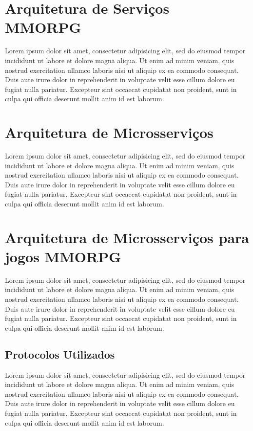\section{Arquitetura de Serviços MMORPG}

Lorem ipsum dolor sit amet, consectetur adipisicing elit, sed do eiusmod tempor incididunt ut labore et dolore magna aliqua. Ut enim ad minim veniam, quis nostrud exercitation ullamco laboris nisi ut aliquip ex ea commodo consequat. Duis aute irure dolor in reprehenderit in voluptate velit esse cillum dolore eu fugiat nulla pariatur. Excepteur sint occaecat cupidatat non proident, sunt in culpa qui officia deserunt mollit anim id est laborum.

\section{Arquitetura de Microsserviços}

Lorem ipsum dolor sit amet, consectetur adipisicing elit, sed do eiusmod tempor incididunt ut labore et dolore magna aliqua. Ut enim ad minim veniam, quis nostrud exercitation ullamco laboris nisi ut aliquip ex ea commodo consequat. Duis aute irure dolor in reprehenderit in voluptate velit esse cillum dolore eu fugiat nulla pariatur. Excepteur sint occaecat cupidatat non proident, sunt in culpa qui officia deserunt mollit anim id est laborum.


\section{Arquitetura de Microsserviços para jogos MMORPG}

Lorem ipsum dolor sit amet, consectetur adipisicing elit, sed do eiusmod tempor incididunt ut labore et dolore magna aliqua. Ut enim ad minim veniam, quis nostrud exercitation ullamco laboris nisi ut aliquip ex ea commodo consequat. Duis aute irure dolor in reprehenderit in voluptate velit esse cillum dolore eu fugiat nulla pariatur. Excepteur sint occaecat cupidatat non proident, sunt in culpa qui officia deserunt mollit anim id est laborum.

\subsection{Protocolos Utilizados}

Lorem ipsum dolor sit amet, consectetur adipisicing elit, sed do eiusmod tempor incididunt ut labore et dolore magna aliqua. Ut enim ad minim veniam, quis nostrud exercitation ullamco laboris nisi ut aliquip ex ea commodo consequat. Duis aute irure dolor in reprehenderit in voluptate velit esse cillum dolore eu fugiat nulla pariatur. Excepteur sint occaecat cupidatat non proident, sunt in culpa qui officia deserunt mollit anim id est laborum.

